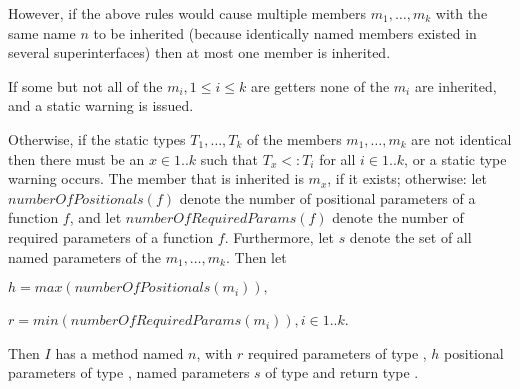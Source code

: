 \documentclass{article}
\begin{document}

\LMHash{}
However, if the above rules would cause multiple members $m_1, \ldots, m_k$ with the same name $n$ to be inherited (because identically named members existed in several superinterfaces) then at most one member is inherited.

\LMHash{}
If some but not all of the $m_i, 1 \le i \le k$ are getters none of the $m_i$ are inherited, and a static warning is issued.

\LMHash{}
Otherwise, if the static types $T_1, \ldots, T_k$ of the members $m_1, \ldots, m_k$ are not identical then there must be an $x \in 1 .. k$ such that $T_x <: T_i$ for all $i \in 1 .. k$,
or a static type warning occurs.
The member that is inherited  is $m_x$, if it exists; otherwise:
let $numberOfPositionals(f)$ denote the number of positional parameters of a function $f$,
and let $numberOfRequiredParams(f)$ denote the number of required parameters of a function $f$.
Furthermore, let $s$ denote the set of all named parameters of the $m_1, \ldots, m_k$.
Then let

$h = max(numberOfPositionals(m_i)), $

$r = min(numberOfRequiredParams(m_i)), i \in 1 .. k$.

\LMHash{}
Then $I$ has a method named $n$, with $r$ required parameters of type \DYNAMIC{}, $h$ positional parameters of type \DYNAMIC{}, named parameters $s$ of type \DYNAMIC{} and return type \DYNAMIC{}.



\end{document}
